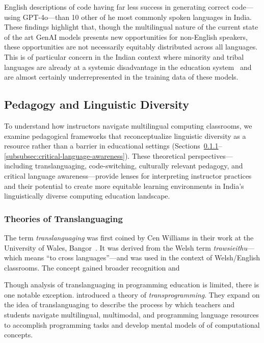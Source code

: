 English descriptions of code having far less success in generating correct
code---using GPT-4o---than 10 other of he most commonly spoken languages in
India. These findings highlight that, though the multilingual nature of the
current state of the art GenAI models presents new opportunities for non-English
speakers, these opportunities are not necessarily equitably distributed across
all languages. This is of particular concern in the Indian context where
minority and tribal languages are already at a systemic disadvantage in the
education system~\cite{mohanty2017language} and are almost certainly
underrepresented in the training data of these models.



\subsection{Pedagogy and Linguistic Diversity}\label{subsec:pedagogy-and-linguistic-diversity}

To understand how instructors navigate multilingual computing classrooms,
we examine pedagogical frameworks that reconceptualize linguistic diversity
as a resource rather than a barrier in educational settings
(Sections~\ref{subsubsec:theories-of-translanguaging}--\ref{subsubsec:critical-language-awareness}). These theoretical perspectives—including
translanguaging, code-switching, culturally relevant pedagogy, and critical
language awareness—provide lenses for interpreting instructor practices and
their potential to create more equitable learning environments in India's
linguistically diverse computing education landscape.

\subsubsection{Theories of Translanguaging}\label{subsubsec:theories-of-translanguaging}

The term \textit{translanguaging} was first coined by Cen Williams in their
work at the University of Wales, Bangor~\cite{}. It
was derived from the Welsh term \textit{trawsieithu}---which means
``to cross languages''---and was used in the context of Welsh/English classrooms. 
The concept gained broader recognition and 

Though analysis of translanguaging in programming education is limited, there is
one notable exception. \citet{tai2024transprogramming} introduced a theory of
\textit{transprogramming}. They expand on the idea of translanguaging to
describe the process by which teachers and students navigate multilingual,
multimodal, and programming language resources to accomplish programming tasks
and develop mental models of of computational concepts.

